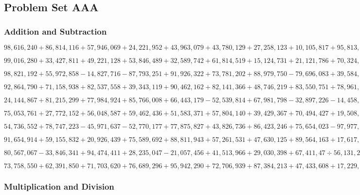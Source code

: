 \hypertarget{problem-set-aaa-13}{%
\subsection{Problem Set AAA}\label{problem-set-aaa-13}}

\hypertarget{addition-and-subtraction-369}{%
\subsubsection{Addition and
Subtraction}\label{addition-and-subtraction-369}}

\(98,616,240+86,814,116+57,946,069+24,221,952+43,963,079+43,780,129+27,258,123+10,105,817+95,813,468+18,982,850\)

\(99,016,280+33,427,811+49,221,128+53,846,489+32,589,742+61,814,519+15,124,731+21,121,786+70,324,450+29,667,828\)

\(98,821,192+55,972,858-14,827,716-87,793,251+91,926,322+73,781,202+88,979,750-79,696,083+39,584,737-87,505,134\)

\(92,864,790+71,158,938+82,537,558+39,343,119+90,462,162+82,141,366+48,746,219+83,550,751+78,961,321+63,888,770\)

\(24,144,867+81,215,299+77,984,924+85,766,008+66,443,179-52,539,814+67,981,798-32,897,226-14,458,039-13,434,890\)

\(75,053,761+27,772,152+56,048,587+59,462,436+51,583,371+57,804,140+39,429,367+70,494,427+19,508,894+86,808,754\)

\(54,736,552+78,747,223-45,971,637-52,770,177+77,875,827+43,826,736+86,423,246+75,654,023-97,977,50÷40,527,336\)

\(91,654,914+59,155,832+20,926,439+75,589,692+88,811,943+57,261,531+47,630,125+89,564,163+17,617,845+34,504,377\)

\(80,567,067-33,846,341+94,474,411+28,235,047-21,057,456+41,513,966+29,030,398+67,411,47÷56,131,245-69,180,389\)

\(73,758,550+62,391,850+71,703,620+76,689,296+95,942,290+72,706,939+87,384,213+47,433,608+17,229,701+79,329,256\)

\hypertarget{multiplication-and-division-368}{%
\subsubsection{Multiplication and
Division}\label{multiplication-and-division-368}}


